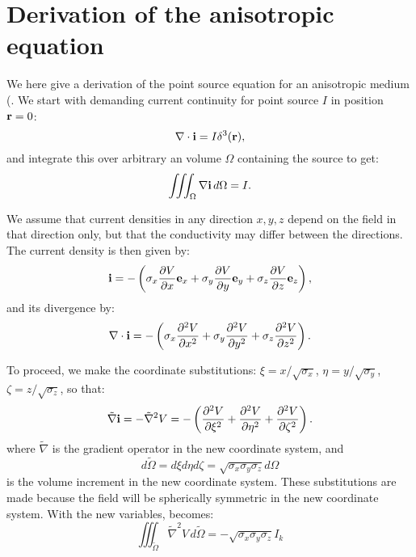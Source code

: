 \chapter{Derivation of the anisotropic equation}
\label{app:anisoappendix}
We here give a derivation of the point source equation for an anisotropic medium
(. We start with demanding current continuity 
for point source $I$ in position ${\bf r} = 0$: 
\begin{equation}
\nabla\cdot{\mathbf{i}} = I \delta^3({\bf r}), 
\label{eq:AppC:1}
\end{equation}
and integrate this over arbitrary an volume $\Omega$ containing the source to get: 
\begin{equation}
\iiint_{\Omega} \nabla {\bf i} \,d\Omega =  I.
\label{eq:AppC:marit}
\end{equation}

We assume that current densities in any direction $x,y,z$ depend on the field in that direction only, 
but that the conductivity may differ between the directions. The current density is then given by: 
\begin{equation}
{\bf i} = - \left(\sigma_x \frac{\partial V}{\partial x} {\bf e}_x +
 \sigma_y \frac{\partial V}{\partial y} {\bf e}_y +
  \sigma_z \frac{\partial V}{\partial z} {\bf e}_z \right), 
\label{eq:AppC:i}
\end{equation}
and its divergence by: 
\begin{equation}
\nabla \cdot {\bf i} = -\left(\sigma_x \frac{\partial^2 V}{\partial x^2} +
 \sigma_y \frac{\partial^2 V}{\partial y^2}+
  \sigma_z \frac{\partial^2 V}{\partial z^2} \right).
\label{eq:AppC:nablai}
\end{equation}

To proceed, we make the coordinate substitutions: 
$\xi = x/\sqrt{\sigma_x}$, $\eta = y/\sqrt{\sigma_y}$, $\zeta = z/\sqrt{\sigma_z}$, 
so that:
\begin{equation}
\tilde{\nabla} {\bf i} = - \tilde{\nabla}^2 V = - \left(\frac{\partial^2 V}{\partial \xi^2} + \frac{\partial^2 V}{\partial \eta^2}+ \frac{\partial^2 V}{\partial \zeta^2} \right).
\label{eq:AppC:nablai2}
\end{equation}
where $\tilde{\nabla}$ is the gradient operator in the new coordinate system, and
\begin{equation}
d\tilde{\Omega} = d\xi d\eta d\zeta =  \sqrt{\sigma_x\sigma_y\sigma_z} d\Omega
\label{eq:AppC:domega}
\end{equation}
is the volume increment in the new coordinate system. These substitutions are made because the field will be spherically symmetric in the new coordinate system. With the new variables,  becomes:
\begin{equation}
\iiint_{\tilde{\Omega}} \tilde{\nabla}^2 V \,d\tilde{\Omega} =  - \sqrt{\sigma_x\sigma_y\sigma_z}I_k
\label{eq:AppC:marit2}
\end{equation}

